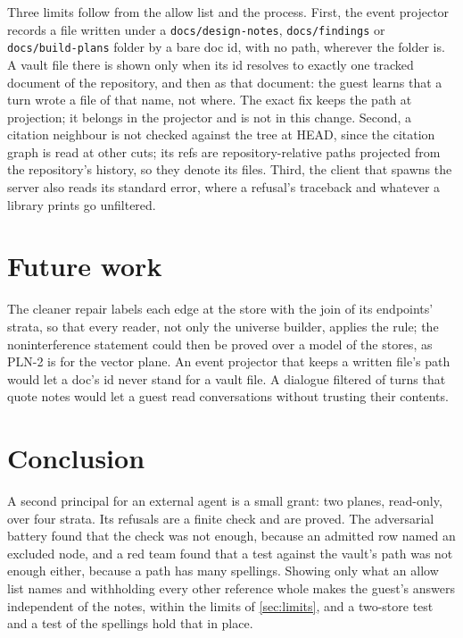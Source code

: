 \documentclass[11pt]{article}
\theoremstyle{plain}
\theoremstyle{definition}
\theoremstyle{remark}
\begin{document}
Three limits follow from the allow list and the process. First, the event projector records a
file written under a \texttt{docs/design-notes}, \texttt{docs/findings} or
\texttt{docs/build-plans} folder by a bare doc id, with no path, wherever the folder is. A vault
file there is shown only when its id resolves to exactly one tracked document of the repository,
and then as that document: the guest learns that a turn wrote a file of that name, not where. The
exact fix keeps the path at projection; it belongs in the projector and is not in this change.
Second, a citation neighbour is not checked against the tree at HEAD, since the citation graph is
read at other cuts; its refs are repository-relative paths projected from the repository's
history, so they denote its files. Third, the client that spawns the server also reads its
standard error, where a refusal's traceback and whatever a library prints go unfiltered.

\section{Future work}

The cleaner repair labels each edge at the store with the join of its endpoints' strata, so that
every reader, not only the universe builder, applies the rule; the noninterference statement could
then be proved over a model of the stores, as PLN-2 is for the vector plane. An event projector
that keeps a written file's path would let a doc's id never stand for a vault file. A dialogue
filtered of turns that quote notes would let a guest read conversations without trusting their
contents.

\section{Conclusion}

A second principal for an external agent is a small grant: two planes, read-only, over four
strata. Its refusals are a finite check and are proved. The adversarial battery found that the
check was not enough, because an admitted row named an excluded node, and a red team found that a
test against the vault's path was not enough either, because a path has many spellings. Showing
only what an allow list names and withholding every other reference whole makes the guest's
answers independent of the notes, within the limits of \cref{sec:limits}, and a two-store test
and a test of the spellings hold that in place.



\end{document}

